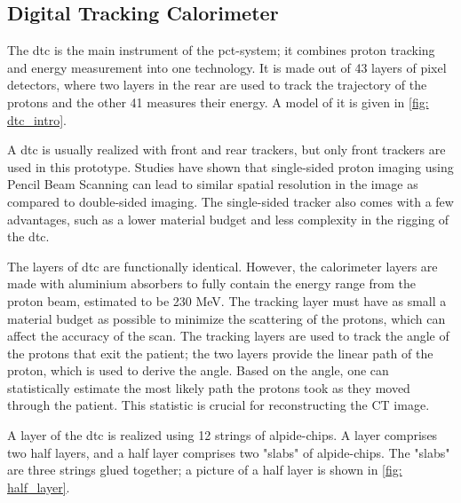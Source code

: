 \documentclass[main.tex]{subfiles}
\begin{document}
\subsection{Digital Tracking Calorimeter}

The \gls{dtc} is the main instrument of the \gls{pct}-system; it combines proton tracking and energy measurement into one technology. It is made out of 43 layers of pixel detectors, where two layers in the rear are used to track the trajectory of the protons and the other 41 measures their energy. A model of it is given in \autoref{fig: dtc_intro}.

A \gls{dtc} is usually realized with front and rear trackers, but only front trackers are used in this prototype. Studies have shown that single-sided proton imaging using Pencil Beam Scanning can lead to similar spatial resolution in the image as compared to double-sided imaging\cite{pbs_result}. The single-sided tracker also comes with a few advantages, such as a lower material budget and less complexity in the rigging of the \gls{dtc}.

The layers of \gls{dtc} are functionally identical. However, the calorimeter layers are made with aluminium absorbers to fully contain the energy range from the proton beam, estimated to be 230 MeV. The tracking layer must have as small a material budget as possible to minimize the scattering of the protons, which can affect the accuracy of the scan. The tracking layers are used to track the angle of the protons that exit the patient; the two layers provide the linear path of the proton, which is used to derive the angle. Based on the angle, one can statistically estimate the most likely path the protons took as they moved through the patient. This statistic is crucial for reconstructing the CT image.

A layer of the \gls{dtc} is realized using 12 strings of \gls{alpide}-chips. A layer comprises two half layers, and a half layer comprises two "slabs" of \gls{alpide}-chips. The "slabs" are three strings glued together; a picture of a half layer is shown in \autoref{fig: half_layer}.
\end{document}
